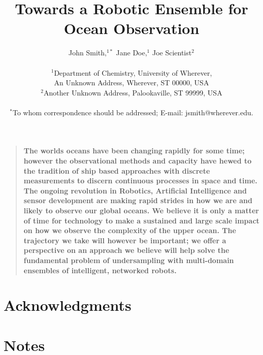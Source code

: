 \documentclass[12pt]{article}
\title{Towards a Robotic Ensemble for Ocean Observation}
\author
{John Smith,$^{1\ast}$ Jane Doe,$^{1}$ Joe Scientist$^{2}$\\
\\
\normalsize{$^{1}$Department of Chemistry, University of Wherever,}\\
\normalsize{An Unknown Address, Wherever, ST 00000, USA}\\
\normalsize{$^{2}$Another Unknown Address, Palookaville, ST 99999, USA}\\
\\
\normalsize{$^\ast$To whom correspondence should be addressed; E-mail:  jsmith@wherever.edu.}
}
\date{}
\newenvironment{sciabstract}{%
\begin{quote} \bf}
{\end{quote}}
\begin{document}

\maketitle 


\begin{sciabstract}
  The worlds oceans have been changing rapidly for some time; however
  the observational methods and capacity have hewed to the tradition
  of ship based approaches with discrete measurements to discern
  continuous processes in space and time.  The ongoing revolution in
  Robotics, Artificial Intelligence and sensor development are making
  rapid strides in how we are and likely to observe our global
  oceans. We believe it is only a matter of time for technology to
  make a sustained and large scale impact on how we observe the
  complexity of the upper ocean. The trajectory we take will however
  be important; we offer a perspective on an approach we believe will
  help solve the fundamental problem of undersampling with
  multi-domain ensembles of intelligent, networked robots.
  
  
\end{sciabstract}





  








\section*{Acknowledgments}

\section{Notes}




\end{document}
